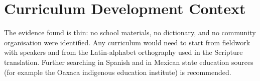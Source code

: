 \documentclass[12pt]{article}
\begin{document}
\section{Curriculum Development Context}
The evidence found is thin: no school materials, no dictionary, and no community organisation were identified. Any curriculum would need to start from fieldwork with speakers and from the Latin-alphabet orthography used in the Scripture translation. Further searching in Spanish and in Mexican state education sources (for example the Oaxaca indigenous education institute) is recommended.
\end{document}
